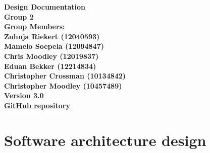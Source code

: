 \documentclass[12pt,a4paper]{article}
\begin{document}
\begin{titlepage}
\linespread{1.1} %

\newcommand{\Title}{Design Documentation} %
\newcommand{\Class}{Cos\ 301} %

	\vspace{4em}
	
	\begin{center}%
	
	  \LARGE \bf \Title \\[4em]
	  \LARGE {\bf Group 2}\\[1em]
	  \LARGE {\bf Group Members:}\\[2em]
	  \large
	     Zuhnja Riekert					(12040593) \\[1em]
	     Mamelo Soepela					(12094847) \\[1em]
	     Chris Moodley					(12019837) \\[1em]
	     Eduan Bekker					(12214834) \\[1em]
	     Christopher Crossman			(10134842) \\[1em]
	     Christopher Moodley			(10457489) \\[1em]
	     {\bf Version 3.0} \\
	    \vspace{0.5in}
	    	\LARGE\href{https://github.com/eduanb/COS301_Phase2}{GitHub repository}
	\end{center}


\end{titlepage}
\tableofcontents


\pagebreak
\section{Software architecture design}
\end{document}
